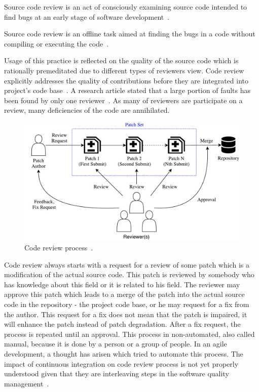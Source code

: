 \begin{DEF}
Source code review is an act of consciously examining source code intended to find bugs at an early stage of software development~\cite{CodeReview_eye_tracking}.
\end{DEF}

\begin{DEF}
Source code review is an offline task aimed at finding the bugs in a code without compiling or executing the code~\cite{CodeReview_eye_tracking}.
\end{DEF}

Usage of this practice is reflected on the quality of the source code which is rationally premeditated due to different types of reviewers view. Code review explicitly addresses the quality of contributions before they are integrated into project's code base~\cite{CodeReview_quality}. A research article stated that a large portion of faults has been found by only one reviewer~\cite{CodeReview_evaluation}. As many of reviewers are participate on a review, many deficiencies of the code are annihilated.

\begin{figure}[H]
    \centering
    \includegraphics[scale=0.5]{img/process_of_review.pdf}
    \caption{Code review process~\cite{CodeReview_IFstatement}.}
    \label{fig:review_process}
\end{figure}

Code review always starts with a request for a review of some patch which is a modification of the actual source code. This patch is reviewed by somebody who has knowledge about this field or it is related to his field. The reviewer may approve this patch which leads to a merge of the patch into the actual source code in the repository - the project code base, or he may request for a fix from the author. This request for a fix does not mean that the patch is impaired, it will enhance the patch instead of patch degradation. After a fix request, the process is repeated until an approval. This process in non-automated, also called manual, because it is done by a person or a group of people. In an agile development, a thought has arisen which tried to automate this process. The impact of continuous integration on code review process is not yet properly understood given that they are interleaving steps in the software quality management~\cite{CodeReview_impact_of_CI}.

